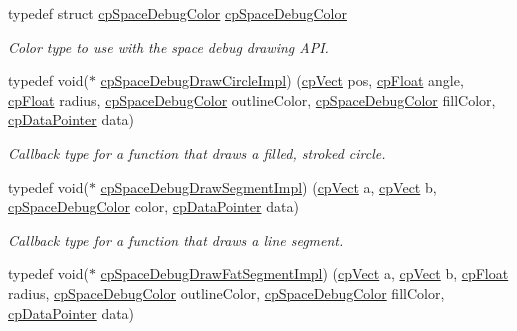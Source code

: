 \begin{DoxyCompactItemize}
typedef struct \mbox{\hyperlink{structcp_space_debug_color}{cp\+Space\+Debug\+Color}} \mbox{\hyperlink{group__cp_space_gafc46fcefca8c28112ca8245eef00bae7}{cp\+Space\+Debug\+Color}}
\begin{DoxyCompactList}\small\item\em Color type to use with the space debug drawing A\+PI. \end{DoxyCompactList}\item 
\mbox{\label{group__cp_space_gab96ab3199114538fa70cb5f7c6b2887a}} 
typedef void($\ast$ \mbox{\hyperlink{group__cp_space_gab96ab3199114538fa70cb5f7c6b2887a}{cp\+Space\+Debug\+Draw\+Circle\+Impl}}) (\mbox{\hyperlink{structcp_vect}{cp\+Vect}} pos, \mbox{\hyperlink{group__basic_types_gac1ed65573e035bf892505768c852d8d3}{cp\+Float}} angle, \mbox{\hyperlink{group__basic_types_gac1ed65573e035bf892505768c852d8d3}{cp\+Float}} radius, \mbox{\hyperlink{structcp_space_debug_color}{cp\+Space\+Debug\+Color}} outline\+Color, \mbox{\hyperlink{structcp_space_debug_color}{cp\+Space\+Debug\+Color}} fill\+Color, \mbox{\hyperlink{group__basic_types_ga2ac2c3c31e21893941f9e4f8ee279447}{cp\+Data\+Pointer}} data)
\begin{DoxyCompactList}\small\item\em Callback type for a function that draws a filled, stroked circle. \end{DoxyCompactList}\item 
\mbox{\label{group__cp_space_gaed387c6356be81f3da4050547fe47c9e}} 
typedef void($\ast$ \mbox{\hyperlink{group__cp_space_gaed387c6356be81f3da4050547fe47c9e}{cp\+Space\+Debug\+Draw\+Segment\+Impl}}) (\mbox{\hyperlink{structcp_vect}{cp\+Vect}} a, \mbox{\hyperlink{structcp_vect}{cp\+Vect}} b, \mbox{\hyperlink{structcp_space_debug_color}{cp\+Space\+Debug\+Color}} color, \mbox{\hyperlink{group__basic_types_ga2ac2c3c31e21893941f9e4f8ee279447}{cp\+Data\+Pointer}} data)
\begin{DoxyCompactList}\small\item\em Callback type for a function that draws a line segment. \end{DoxyCompactList}\item 
\mbox{\label{group__cp_space_gab8b2b1f7036daa38914a0d3c2cb1d732}} 
typedef void($\ast$ \mbox{\hyperlink{group__cp_space_gab8b2b1f7036daa38914a0d3c2cb1d732}{cp\+Space\+Debug\+Draw\+Fat\+Segment\+Impl}}) (\mbox{\hyperlink{structcp_vect}{cp\+Vect}} a, \mbox{\hyperlink{structcp_vect}{cp\+Vect}} b, \mbox{\hyperlink{group__basic_types_gac1ed65573e035bf892505768c852d8d3}{cp\+Float}} radius, \mbox{\hyperlink{structcp_space_debug_color}{cp\+Space\+Debug\+Color}} outline\+Color, \mbox{\hyperlink{structcp_space_debug_color}{cp\+Space\+Debug\+Color}} fill\+Color, \mbox{\hyperlink{group__basic_types_ga2ac2c3c31e21893941f9e4f8ee279447}{cp\+Data\+Pointer}} data)

\end{DoxyCompactItemize}
